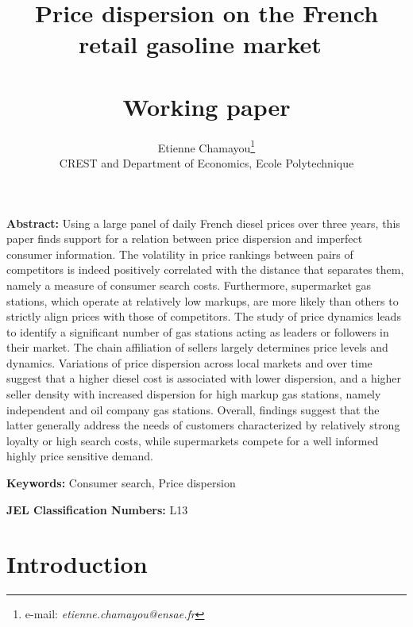 \documentclass[english]{article}
\begin{document}
\title{Price dispersion on the French retail gasoline market\ \\ \ \\Working paper}
\author{Etienne Chamayou\thanks{e-mail:
\textit{etienne.chamayou@ensae.fr}}\medskip\\{\normalsize CREST and Department of Economics, Ecole Polytechnique }}
\maketitle

\sloppy%

\onehalfspacing

\textbf{Abstract:}
Using a large panel of daily French diesel prices over three years, this paper finds support for a relation between price dispersion and imperfect consumer information. The volatility in price rankings between pairs of competitors is indeed positively correlated with the distance that separates them, namely a measure of consumer search costs. Furthermore, supermarket gas stations, which operate at relatively low markups, are more likely than others to strictly align prices with those of competitors. The study of price dynamics leads to identify a significant number of gas stations acting as leaders or followers in their market. The chain affiliation of sellers largely determines price levels and dynamics. Variations of price dispersion across local markets and over time suggest that a higher diesel cost is associated with lower dispersion, and a higher seller density with increased dispersion for high markup gas stations, namely independent and oil company gas stations. Overall, findings suggest that the latter generally address the needs of customers characterized by relatively strong loyalty or high search costs, while supermarkets compete for a well informed highly price sensitive demand.

\strut

\textbf{Keywords:} Consumer search, Price dispersion

\strut

\textbf{JEL Classification Numbers:} L13

\pagebreak%

\section{Introduction}
\end{document}
